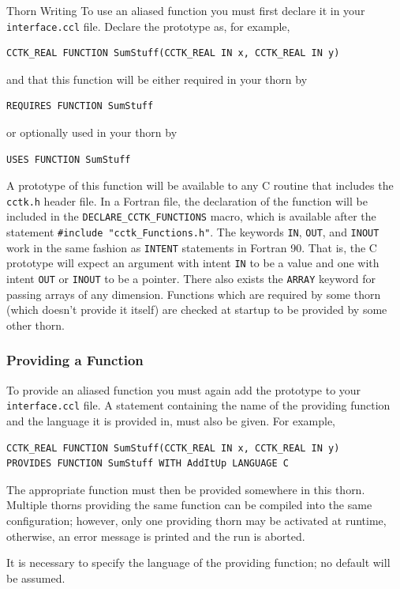 \begin{cactuspart}{Thorn Writing}
To use an aliased function you must first declare it in your 
\texttt{interface.ccl} file. Declare the prototype as, for example,
\begin{verbatim}
CCTK_REAL FUNCTION SumStuff(CCTK_REAL IN x, CCTK_REAL IN y)
\end{verbatim}
\noindent and that this function will be either required in your thorn by
\begin{verbatim}
REQUIRES FUNCTION SumStuff
\end{verbatim}
\noindent or optionally used in your thorn by
\begin{verbatim}
USES FUNCTION SumStuff
\end{verbatim}
A prototype of this function will be available to any C routine that
includes the \texttt{cctk.h} header file.
In a Fortran file, the declaration of the function will be included
in the \texttt{DECLARE\_CCTK\_FUNCTIONS} macro, which is available after
the statement \texttt{\#include "cctk\_Functions.h"}.
The keywords \texttt{IN}, \texttt{OUT}, and \texttt{INOUT}
work in the same fashion as \texttt{INTENT} statements in Fortran 90.
That is, the C prototype will expect an argument with intent \texttt{IN}
to be a value and one with intent \texttt{OUT} or \texttt{INOUT} to be a
pointer. There also exists the \texttt{ARRAY} keyword for passing arrays
of any dimension.
Functions which are required by some thorn (which doesn't provide it itself)
are checked at startup to be provided by some other thorn.


\subsubsection{Providing a Function}

To provide an aliased function you must again add the prototype to
your \texttt{interface.ccl} file. A statement containing the name of the
providing function and the language it is provided in, must also be
given. For example,
\begin{verbatim}
CCTK_REAL FUNCTION SumStuff(CCTK_REAL IN x, CCTK_REAL IN y)
PROVIDES FUNCTION SumStuff WITH AddItUp LANGUAGE C
\end{verbatim}
The appropriate function must then be provided somewhere in this
thorn. Multiple thorns providing the same function can be compiled into the
same configuration; however, only one providing thorn may be activated at
runtime, otherwise, an error message is printed and the run is aborted.

It is necessary to specify the language of the providing function; no
default will be assumed.



\end{cactuspart}
